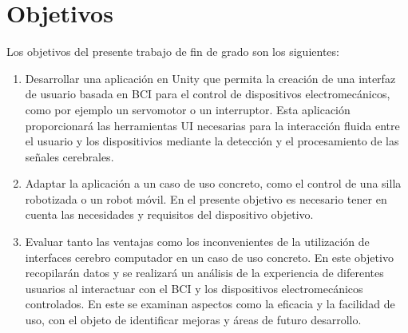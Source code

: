 \section{Objetivos}

Los objetivos del presente trabajo de fin de grado son los siguientes:

\begin{enumerate}
\item Desarrollar una aplicación en Unity que permita la creación de una interfaz de usuario basada en BCI para el control de dispositivos electromecánicos, como por ejemplo un servomotor o un interruptor. Esta aplicación proporcionará las herramientas UI necesarias para la interacción fluida entre el usuario y los dispositivios mediante la detección y el procesamiento de las señales cerebrales.

\item Adaptar la aplicación a un caso de uso concreto, como el control de una silla robotizada o un robot móvil. En el presente objetivo es necesario tener en cuenta las necesidades y requisitos del dispositivo objetivo.

\item Evaluar tanto las ventajas como los inconvenientes de la utilización de interfaces cerebro computador en un caso de uso concreto. En este objetivo recopilarán datos y se realizará un análisis de la experiencia de diferentes usuarios al interactuar con el BCI y los dispositivos electromecánicos controlados. En este se examinan aspectos como la eficacia y la facilidad de uso, con el objeto de identificar mejoras y áreas de futuro desarrollo.
\end{enumerate}